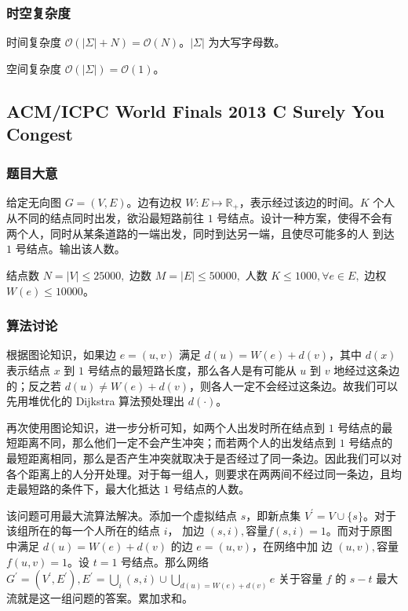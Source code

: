 			\subsubsection{时空复杂度}
				时间复杂度 $\mathcal{O}\left(|\varSigma|+N\right) = \mathcal{O}\left(N\right)$。$|\varSigma|$ 为大写字母数。
				
				空间复杂度 $\mathcal{O}\left(|\varSigma|\right) = \mathcal{O}\left(1\right)$。
		
		
		
			
		\newpage
		\subsection{ACM/ICPC World Finals 2013 C Surely You Congest}
			\subsubsection{题目大意}
				给定无向图 $G = (V,E)$。边有边权 $ W:E \mapsto \mathbb{R}_+$，表示经过该边的时间。$K$ 个人从不同的结点同时出发，欲沿最短路前往 $1$ 号结点。设计一种方案，使得不会有两个人，同时从某条道路的一端出发，同时到达另一端，且使尽可能多的人
				到达  $1$ 号结点。输出该人数。
				
				结点数 $N = |V| \le \num{25 000},$ 边数 $ M = |E| \le \num{50 000},$ 人数 $K \le \num{1 000}, \forall e \in E, $ 边权 $W(e) \le \num{10 000}$。
			\subsubsection{算法讨论}
				根据图论知识，如果边 $ e = (u,v)$  满足 $d(u) = W(e) + d(v)$，其中 $d(x)$ 表示结点 $x$ 到 $1$ 号结点的最短路长度，那么各人是有可能从 $u$ 到 $v$ 地经过这条边的；反之若  $d(u) \ne W(e) + d(v)$，则各人一定不会经过这条边。故我们可以先用堆优化的 Dijkstra 算法预处理出 $d(\cdot)$。
				
				再次使用图论知识，进一步分析可知，如两个人出发时所在结点到 $1$ 号结点的最短距离不同，那么他们一定不会产生冲突；而若两个人的出发结点到 $  1$ 号结点的最短距离相同，那么是否产生冲突就取决于是否经过了同一条边。因此我们可以对各个距离上的人分开处理。对于每一组人，则要求在两两间不经过同一条边，且均走最短路的条件下，最大化抵达 $1$ 号结点的人数。
				
				该问题可用最大流算法解决。添加一个虚拟结点 $s$，即新点集 $V^\prime = V \cup \{s\}$。对于该组所在的每一个人所在的结点 $i$， 加边 $(s,i),$容量$ f(s,i) = 1$。而对于原图中满足 $d(u) = W(e) + d(v)$ 的边 $e=(u,v)$，在网络中加
				边 $(u,v),$容量$f(u,v)=1$。设 $t = 1$ 号结点。那么网络 $\textstyle G^\prime = (V^\prime,E^\prime), E^\prime = \bigcup_{i} (s,i) \cup \bigcup_{d(u) = W(e) + d(v)} e  $ 关于容量 $f$ 的 $s-t$ 最大流就是这一组问题的答案。累加求和。
				
